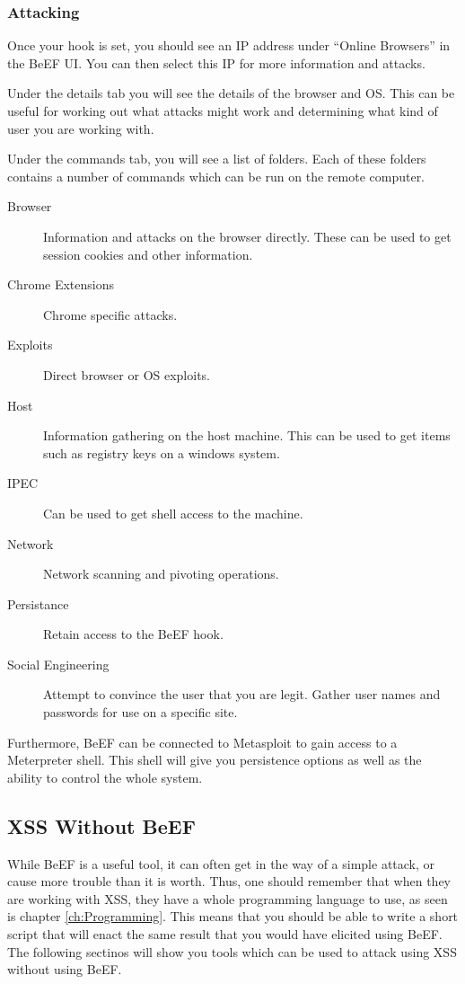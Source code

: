			\subsubsection{Attacking}
				Once your hook is set, you should see an IP address under ``Online Browsers'' in the BeEF UI. 
				You can then select this IP for more information and attacks. 
				
				Under the details tab you will see the details of the browser and OS. 
				This can be useful for working out what attacks might work and determining what kind of user you are working with. 

				Under the commands tab, you will see a list of folders. 
				Each of these folders contains a number of commands which can be run on the remote computer. 
				\begin{description}
					\item[Browser] Information and attacks on the browser directly. 
						These can be used to get session cookies and other information. 
					\item[Chrome Extensions] Chrome specific attacks. 
					\item[Exploits] Direct browser or OS exploits. 
					\item[Host] Information gathering on the host machine. 
						This can be used to get items such as registry keys on a windows system. 
					\item[IPEC] Can be used to get shell access to the machine. 
					\item[Network] Network scanning and pivoting operations. 
					\item[Persistance] Retain access to the BeEF hook. 
					\item[Social Engineering] Attempt to convince the user that you are legit. 
						Gather user names and passwords for use on a specific site. 
				\end{description}

				Furthermore, BeEF can be connected to Metasploit to gain access to a Meterpreter shell. 
				This shell will give you persistence options as well as the ability to control the whole system. 
		\subsection{XSS Without BeEF}
			While BeEF is a useful tool, it can often get in the way of a simple attack, or cause more trouble than it is worth. 
			Thus, one should remember that when they are working with XSS, they have a whole programming language to use, as seen is chapter \ref{ch:Programming}.
			This means that you should be able to write a short script that will enact the same result that you would have elicited using BeEF. 
			The following sectinos will show you tools which can be used to attack using XSS without using BeEF. 

